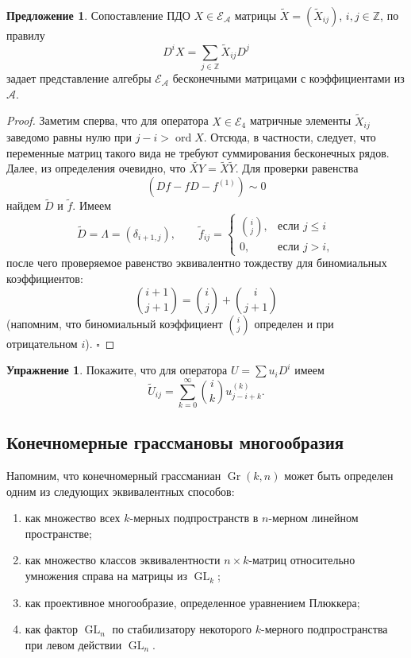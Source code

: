 \documentclass{article}
\theoremstyle{definition}
\theoremstyle{definition} %
\theoremstyle{remark}     %
\theoremstyle{definition}
\theoremstyle{definition}
\theoremstyle{definition}
\theoremstyle{definition}
\theoremstyle{definition}
\newtheorem{proposition}[theorem]{Предложение}
\theoremstyle{definition}
\theoremstyle{definition}
\theoremstyle{definition}
\newtheorem{exercise}{Упражнение}[section]
\begin{document}
\begin{proposition}
  Сопоставление ПДО \(X \in \mathcal{E}_\mathcal{A}\) матрицы \(\tilde{X} = (\tilde{X}_{ij})\), \(i, j \in \mathbb{Z}\), по правилу  
  \[
    D^i X = \sum_{j \in \mathbb{Z}} \tilde{X}_{ij} D^j
  \]
  задает представление алгебры \(\mathcal{E}_\mathcal{A}\) бесконечными матрицами с коэффициентами из \(\mathcal{A}\).
\end{proposition}


\begin{proof}
  Заметим сперва, что для оператора \(X \in \mathcal{E}_4\) матричные элементы \(\tilde{X}_{ij}\) заведомо равны нулю при \(j - i > \operatorname{ord} X\). Отсюда, в частности, следует, что переменные матриц такого вида не требуют суммирования бесконечных рядов. Далее, из определения очевидно, что \(\widetilde{XY} = \tilde{X}\tilde{Y}\). Для проверки равенства
  \[
    (Df - fD - f^{(1)}) \sim 0
  \]
  найдем \(\tilde{D}\) и \(\tilde{f}\). Имеем
  \[
    \tilde{D} = \Lambda = (\delta_{i+1,j}),\qquad
    \tilde{f}_{ij} = 
    \begin{cases} 
      \binom{i}{j}, & \text{если } j \le i \\[2pt]
      0, & \text{если } j > i,
    \end{cases}
  \]
  после чего проверяемое равенство эквивалентно тождеству для биномиальных коэффициентов:
  \[
    \binom{i+1}{j+1} = \binom{i}{j} + \binom{i}{j+1}
  \]
  (напомним, что биномиальный коэффициент \(\binom{i}{j}\) определен и при отрицательном \(i\)). \(\square\)
\end{proof}

\begin{exercise}
  Покажите, что для оператора \(U = \sum u_i D^i\) имеем
  \[
    \tilde{U}_{ij} = \sum_{k=0}^{\infty} \binom{i}{k} u_{j-i+k}^{(k)}.
  \]
\end{exercise}

\subsection{Конечномерные грассмановы многообразия}

Напомним, что конечномерный грассманиан \(\operatorname{Gr}(k, n)\) может быть определен одним из следующих эквивалентных способов:
\begin{enumerate}
  \item как множество всех \(k\)-мерных подпространств в \(n\)-мерном линейном пространстве;
  \item как множество классов эквивалентности \(n \times k\)-матриц относительно умножения справа на матрицы из \(\operatorname{GL}_k\);
  \item как проективное многообразие, определенное уравнением Плюккера;
  \item как фактор \(\operatorname{GL}_n\) по стабилизатору некоторого \(k\)-мерного подпространства при левом действии \(\operatorname{GL}_n\).
\end{enumerate}
\end{document}
